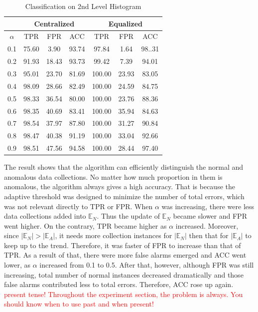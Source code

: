 \documentclass[10pt,conference,letterpaper]{IEEEtran}
\begin{document}
			\begin{table}[!ht]
				\centering
				\caption{Classification on 2nd Level Histogram}
				\label{tab:syn-result-2nd}
				\begin{tabular}{|c|c|c|c|c|c|c|}
					\hline
					& \multicolumn{3}{c|}{Centralized} & \multicolumn{3}{c|}{Equalized}\\
					\hline
					$\alpha$ & TPR & FPR & ACC & TPR & FPR & ACC \\ 
					\hline
					0.1 & 75.60 & 3.90 & 93.74 & 97.84 & 1.64 & 98..31 \\ 
					\hline
					0.2 & 91.93 & 18.43 & 93.73 & 99.42 & 7.39 & 94.01 \\ 
					\hline
					0.3 & 95.01 & 23.70 & 81.69 & 100.00 & 23.93 & 83.05 \\ 
					\hline
					0.4 & 98.09 & 28.66 & 82.49 & 100.00 & 24.59 & 84.75 \\ 
					\hline
					0.5 & 98.33 & 36.54 & 80.00 & 100.00 & 23.76 & 88.36 \\ 
					\hline
					0.6 & 98.35 & 40.69 & 83.41 & 100.00 & 35.94 & 84.63 \\ 
					\hline
					0.7 & 98.54 & 37.97 & 87.80 & 100.00 & 31.27 & 90.84 \\ 
					\hline
					0.8 & 98.47 & 40.38 & 91.19 & 100.00 & 33.04 & 92.66 \\ 
					\hline
					0.9 & 98.51 & 47.56 & 94.58 & 100.00 & 28.44 & 97.40\\
					\hline
				\end{tabular} 
			\end{table}
			
			The result shows that the algorithm can efficiently distinguish the normal and anomalous data collections. No matter how much proportion in them is anomalous, the algorithm always gives a high accuracy. That is because the adaptive threshold was designed to minimize the number of total errors, which was not relevant directly to TPR or FPR. When $\alpha$ was increasing, there were less data collections added into $\mathbb{E}_N$. Thus the update of $\mathbb{E}_N$ became slower and FPR went higher. On the contrary, TPR became higher as $\alpha$ increased. Moreover, since $|\mathbb{E}_N| > |\mathbb{E}_A|$, it needs more collection instances for $|\mathbb{E}_N|$ then that for $|\mathbb{E}_A|$ to keep up to the trend. Therefore, it was faster of FPR to increase than that of TPR. As a result of that, there were more false alarms emerged and ACC went lower, as $\alpha$ increased from 0.1 to 0.5. After that, however, although FPR was still increasing, total number of normal instances decreased dramatically and those false alarms contributed less to total errors. Therefore, ACC rose up again. \textcolor{red}{present tense! Throughout the experiment section, the problem is always. You should know when to use past and when present!}
	
\end{document}
